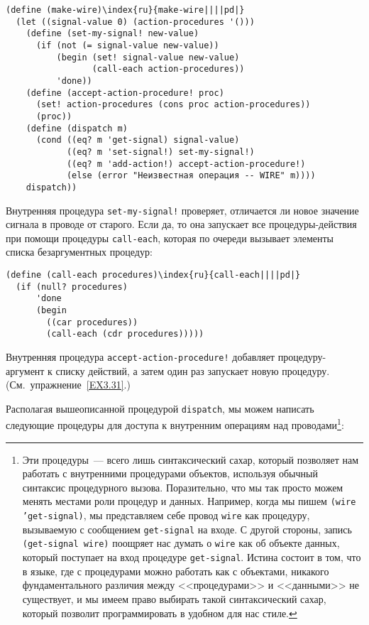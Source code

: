 \begin{Verbatim}[fontsize=\small]
(define (make-wire)\index{ru}{make-wire||||pd|}
  (let ((signal-value 0) (action-procedures '()))
    (define (set-my-signal! new-value)
      (if (not (= signal-value new-value))
          (begin (set! signal-value new-value)
                 (call-each action-procedures))
          'done))
    (define (accept-action-procedure! proc)
      (set! action-procedures (cons proc action-procedures))
      (proc))
    (define (dispatch m)
      (cond ((eq? m 'get-signal) signal-value)
            ((eq? m 'set-signal!) set-my-signal!)
            ((eq? m 'add-action!) accept-action-procedure!)
            (else (error "Неизвестная операция -- WIRE" m))))
    dispatch))
\end{Verbatim}
Внутренняя процедура {\tt set-my-signal!} проверяет, отличается
ли новое значение сигнала в проводе от старого.  Если да, то она
запускает все процедуры-действия при помощи процедуры
{\tt call-each}, которая по очереди вызывает элементы списка
безаргументных процедур:

\begin{Verbatim}[fontsize=\small]
(define (call-each procedures)\index{ru}{call-each||||pd|}
  (if (null? procedures)
      'done
      (begin
        ((car procedures))
        (call-each (cdr procedures)))))
\end{Verbatim}
Внутренняя процедура
{\tt accept-action-procedure!} добавляет про\-це\-ду\-ру-ар\-гу\-мент к
списку действий, а затем один раз запускает новую %
процедуру. (См.~упражнение~\ref{EX3.31}.)

Располагая вышеописанной процедурой
{\tt dispatch}, мы можем написать следующие процедуры для
доступа к внутренним операциям над
проводами\footnote{\label{FOOT3.27}Эти процедуры~--- всего
  лишь  синтаксический
  сахар, который позволяет нам работать с внутренними процедурами
  объектов, используя обычный синтаксис процедурного вызова. Поразительно,
  что мы так просто можем менять местами роли процедур и данных.
  Например, когда мы пишем {\tt (wire 'get-signal)}, мы
  представляем себе провод {\tt wire} как процедуру, вызываемую с
  сообщением {\tt get-signal} на входе.  С другой стороны, запись
  {\tt (get-signal wire)} поощряет нас думать о {\tt wire}
  как об объекте данных, который поступает на вход процедуре
  {\tt get-signal}.  
  Истина состоит в том, что в языке, где с
  процедурами можно работать как с объектами, никакого фундаментального
  различия между <<процедурами>> и <<данными>> не существует, и мы имеем
  право выбирать такой синтаксический сахар, который позволит
  программировать в удобном для нас стиле.}:

